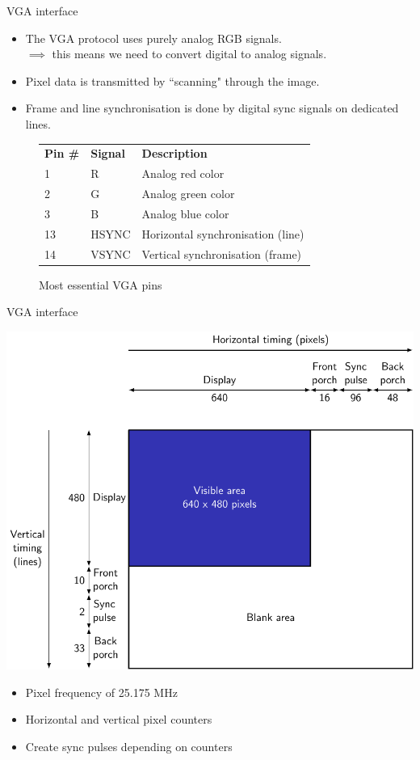 \documentclass{beamer}
\begin{document}
\begin{frame}{VGA interface}
	\begin{itemize}
		\item The VGA protocol uses purely analog RGB signals.\\
		$\implies$ this means we need to convert digital 
		to analog signals.
	\item Pixel data is transmitted by ``scanning" 
		through the image.
	\item Frame and line synchronisation is done 
		by digital sync signals on dedicated lines.
	\end{itemize}
	\begin{figure}
	\begin{tabular}{l|l|l}
		\textbf{Pin \#} & \textbf{Signal} & \textbf{Description}\\
		1			& R & Analog red color\\
		2			& G	& Analog green color\\
		3			& B & Analog blue color\\
		13		& HSYNC & Horizontal synchronisation (line)\\
		14		& VSYNC & Vertical synchronisation (frame)
	\end{tabular}
	\caption{Most essential VGA pins}
\end{figure}
\end{frame}

\begin{frame}{VGA interface}
	\begin{minipage}{0.66\textwidth}
	\includegraphics[width=\textwidth]{../figures/signals-figure0.pdf}
	\end{minipage}
	\begin{minipage}{0.32\textwidth}
		\begin{itemize}
			\item Pixel frequency of 25.175 MHz
			\item Horizontal and vertical pixel counters
			\item Create sync pulses depending on counters
		\end{itemize}
	\end{minipage}
\end{frame}
\end{document}
